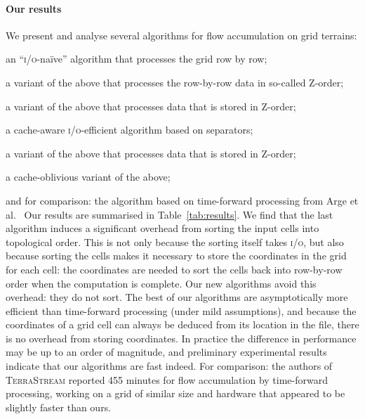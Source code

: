 \documentclass[10pt,a4paper]{article}
\newenvironment{denseitems}{\list{$\bullet$}{\itemsep0pt\parsep0pt}}{\endlist}
\def\io{\textsc{i/o}\xspace}
\def\tsm{\textsc{TerraStream}\xspace}
\begin{document}
\paragraph*{Our results}
We present and analyse several algorithms for flow accumulation on grid terrains:\begin{denseitems}
\item an ``\io-na\"ive'' algorithm that processes the grid row by row;
\item a variant of the above that processes the row-by-row data in so-called Z-order;
\item a variant of the above that processes data that is stored in Z-order;
\item a cache-aware \io-efficient algorithm based on separators;
\item a variant of the above that processes data that is stored in Z-order;
\item a cache-oblivious variant of the above;
\item and for comparison: the algorithm based on time-forward processing from Arge et al.~\cite{terraflow,gridproblems,terrastream}
\end{denseitems}
Our results are summarised in Table~\ref{tab:results}.
We find that the last algorithm induces a significant overhead from sorting the input cells into topological order. This is not only because the sorting itself takes \io, but also because sorting the cells makes it necessary to store the coordinates in the grid for each cell: the coordinates are needed to sort the cells back into row-by-row order when the computation is complete. Our new algorithms avoid this overhead: they do not sort. The best of our algorithms are asymptotically more efficient than time-forward processing (under mild assumptions), and because the coordinates of a grid cell can always be deduced from its location in the file, there is no overhead from storing coordinates. In practice the difference in performance may be up to an order of magnitude, and preliminary experimental results indicate that our algorithms are fast indeed. For comparison: the authors of \tsm reported 455 minutes for flow accumulation by time-forward processing, working on a grid of similar size and hardware that appeared to be slightly faster than ours.
\end{document}
